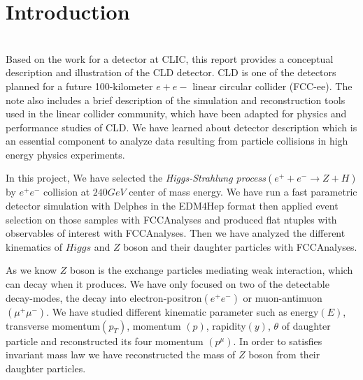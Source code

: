 \chapter{\label{intro}Introduction}

\setcounter{equation}{0}
\setcounter{table}{0}
\setcounter{figure}{0}
\setcounter{chapter}{1}

\baselineskip 24pt
\hspace{10pt}
\\
Based on the work for a detector at CLIC, this report provides a conceptual description and illustration of the CLD detector. CLD is one of the detectors planned for a future 100-kilometer $e+e-$ linear circular collider (FCC-ee). The note also includes  a brief description of the simulation and
reconstruction tools used in the linear collider community, which have been adapted for
physics and performance studies of CLD. We have learned about detector description which is an 
essential component  to analyze data resulting from
particle collisions in high energy physics experiments.
 
In this project, We have selected the \emph{Higgs-Strahlung process}$(e^{+}+ e^{-}\longrightarrow Z+ 
H)$  by  $e^{+}e^{-}$ collision  at $240GeV$ center of mass energy. We have 
run a fast parametric detector simulation with Delphes in the EDM4Hep format
then applied  event selection on those samples with FCCAnalyses
and produced flat ntuples with observables of interest with FCCAnalyses.
Then we have analyzed the different kinematics of $Higgs$ and $Z$ boson and their daughter particles
with FCCAnalyses.

As we know $Z$ boson is the exchange particles mediating weak interaction, which can decay when it 
produces. We have only focused on two of the  detectable decay-modes, the decay into 
electron-positron$(e^{+}e^{-})$ or muon-antimuon$(\mu^{+}\mu^{-})$. 
We have studied different kinematic parameter such as energy$(E)$, transverse momentum$(p_T)$, 
momentum $(p)$, rapidity$(y)$, $\theta$ of daughter particle and  reconstructed its 
four momentum $(p^{\mu})$. In order to satisfies invariant mass law we have reconstructed the mass  of  $Z$ boson from their daughter particles.




